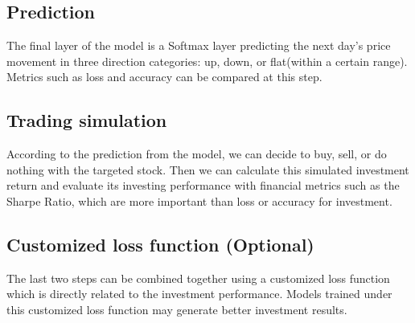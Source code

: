 \documentclass[11pt]{article}
\begin{document}
\subsection{Prediction}
The final layer of the model is a Softmax layer predicting the next day's price movement in three direction categories: up, down, or flat(within a certain range). Metrics such as loss and accuracy can be compared at this step.

\subsection{Trading simulation}
According to the prediction from the model, we can decide to buy, sell, or do nothing with the targeted stock. Then we can calculate this simulated investment return and evaluate its investing performance with financial metrics such as the Sharpe Ratio, which are more important than loss or accuracy for investment.

\subsection{Customized loss function (Optional)}
The last two steps can be combined together using a customized loss function which is directly related to the investment performance. Models trained under this customized loss function may generate better investment results.






\end{document}
